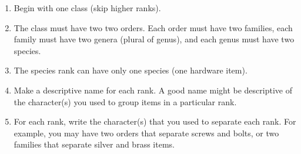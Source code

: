 \documentclass[12pt]{exam}
\begin{document}
\begin{enumerate}

	\item Begin with one class (skip higher ranks).
	
	\item The class must have two two orders. Each order must have two
	families, each family must have two genera (plural of genus), and 
	each genus must have two species.
	
	\item The species rank can have only one species (one hardware item). 

	\item Make a descriptive name for each rank. A good name might be 
	descriptive of the character(s) you used to group items in a 
	particular rank.

	\item For each rank, write the character(s) that you used to separate 
	each rank. For example, you may have two orders that separate screws 
	and bolts, or two families that separate silver and brass items.
	
	
	
	
	
	

\end{enumerate}
\end{document}
